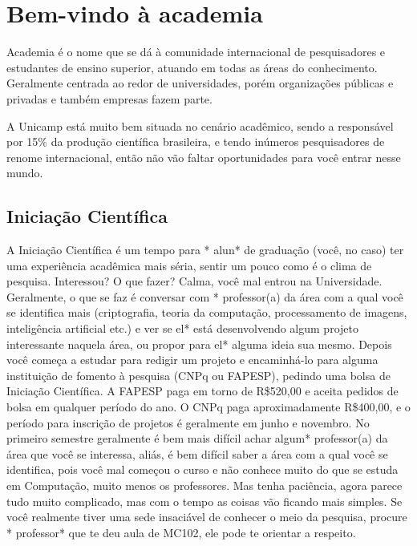 
\section{Bem-vindo à academia}

Academia é o nome que se dá à comunidade internacional de pesquisadores e
estudantes de ensino superior, atuando em todas as áreas do
conhecimento. Geralmente centrada ao redor de universidades, porém organizações
públicas e privadas e também empresas fazem parte.

A Unicamp está muito bem situada no cenário acadêmico, sendo a responsável por
15\% da produção científica brasileira, e tendo inúmeros pesquisadores de renome
internacional, então não vão faltar oportunidades para você entrar nesse mundo.

\subsection{Iniciação Científica}

A Iniciação Científica é um tempo para * alun* de graduação (você, no caso) ter
uma experiência acadêmica mais séria, sentir um pouco como é o clima de
pesquisa. Interessou? O que fazer? Calma, você mal entrou na Universidade.
Geralmente, o que se faz é conversar com * professor(a) da área com a qual você se
identifica mais (criptografia, teoria da computação, processamento de imagens,
inteligência artificial etc.) e ver se el* está desenvolvendo algum projeto
interessante naquela área, ou propor para el* alguma ideia sua mesmo.  Depois
você começa a estudar para redigir um projeto e encaminhá-lo para alguma
instituição de fomento à pesquisa (CNPq ou FAPESP), pedindo uma bolsa de
Iniciação Científica. A FAPESP paga em torno de R\$520,00 e aceita pedidos de
bolsa em qualquer período do ano. O CNPq paga aproximadamente R\$400,00, e o
período para inscrição de projetos é geralmente em junho e novembro. No primeiro
semestre geralmente é bem mais difícil achar algum* professor(a) da área que você se
interessa, aliás, é bem difícil saber a área com a qual você se identifica, pois
você mal começou o curso e não conhece muito do que se estuda em Computação,
muito menos os professores. Mas tenha paciência, agora parece tudo muito
complicado, mas com o tempo as coisas vão ficando mais simples. Se você
realmente tiver uma sede insaciável de conhecer o meio da pesquisa, procure * 
professor* que te deu aula de MC102, ele pode te orientar a respeito.

